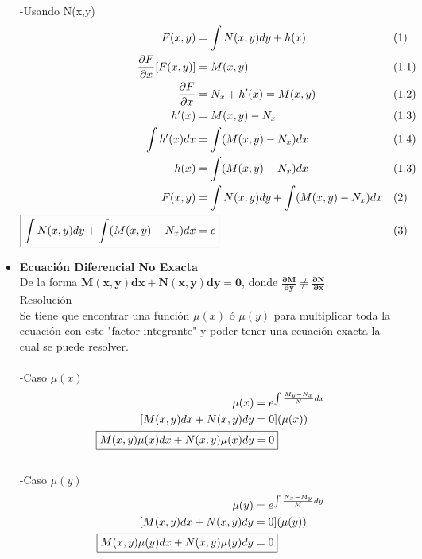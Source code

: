 \documentclass{article}
\begin{document}
\begin{itemize}
    -Usando N(x,y)
    \begin{align*}
        F(x,y) & = \int N(x,y) dy + h(x) &&\text{(1)}\\
        \frac{\partial F}{\partial x}[F(x,y)] & = M(x,y) &&\text{(1.1)}\\
        \frac{\partial F}{\partial x} & = N_x + h'(x) = M(x,y) &&\text{(1.2)}\\
        h'(x) & = M(x,y) - N_x &&\text{(1.3)}\\
        \int h'(x) dx & = \int (M(x,y) - N_x) dx &&\text{(1.4)}\\
        h(x) & = \int (M(x,y) - N_x) dx &&\text{(1.3)}\\
        F(x,y) & = \int N(x,y) dy + \int (M(x,y) - N_x) dx &&\text{(2)}\\
        \Aboxed{ \int N(x,y) dy + \int (M(x,y) - N_x) dx & = c } &&\text{(3)}
    \end{align*}

    \item \textbf{Ecuación Diferencial No Exacta}\\
    De la forma $\boldsymbol{M(x,y)dx + N(x,y)dy = 0} $, donde
     \textbf{$\boldsymbol{\frac{\partial M}{\partial y} \neq \frac{\partial N}{\partial x}}$}.\\
    Resolución \\
    Se tiene que encontrar una función $\mu(x)$ ó $\mu(y)$ para multiplicar toda la ecuación 
    con este "factor integrante" y poder tener una ecuación exacta la cual se puede resolver.\\
    \\-Caso $\mu(x)$ \\
    \begin{align*}
        \mu(x) & = e^{\int \frac{M_y - N_x}{N} dx} \\
        [ M(x,y)dx + N(x,y)dy & = 0 ] (\mu(x)) \\
        \Aboxed{M(x,y)\mu(x)dx + N(x,y)\mu(x)dy & = 0}
    \end{align*}
    \\-Caso $\mu(y)$ \\
    \begin{align*}
        \mu(y) & = e^{\int \frac{N_x - M_y}{M} dy} \\
        [ M(x,y)dx + N(x,y)dy & = 0 ] (\mu(y)) \\
        \Aboxed{M(x,y)\mu(y)dx + N(x,y)\mu(y)dy & = 0}
    \end{align*}


\end{itemize}
\end{document}
